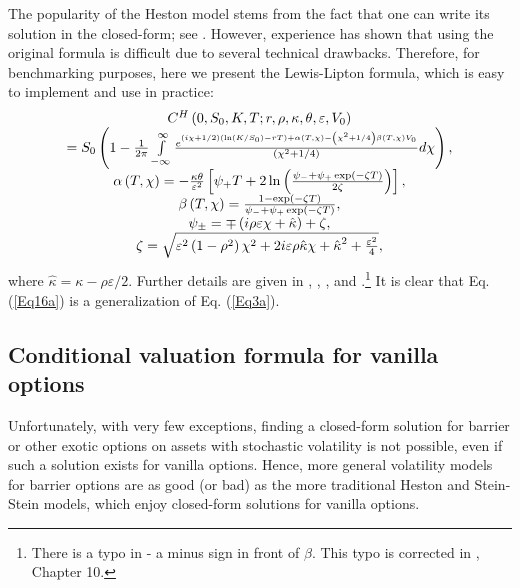 \documentclass{article}
\begin{document}
The popularity of the Heston model stems from the fact that one can write
its solution in the closed-form; see \cite{Heston1993}. However, experience
has shown that using the original formula is difficult due to several
technical drawbacks. Therefore, for benchmarking purposes, here we present
the Lewis-Lipton formula, which is easy to implement and use in practice:%
\begin{equation}
\begin{array}{c}
C^{H}\left( 0,S_{0},K,T;r,\rho ,\kappa ,\theta ,\varepsilon ,V_{0}\right) \\ 
=S_{0}\left( 1-\frac{1}{2\pi }\int\limits_{-\infty }^{\infty }\frac{%
e^{\left( i\chi +1/2\right) \left( \ln \left( K/S_{0}\right) -rT\right)
+\alpha \left( T,\chi \right) -\left( \chi ^{2}+1/4\right) \beta \left(
T,\chi \right) V_{0}}}{\left( \chi ^{2}+1/4\right) }d\chi \right) , \\ 
\alpha \left( T,\chi \right) =-\frac{\kappa \theta }{\varepsilon ^{2}}\left[
\psi _{+}T+2\ln \left( \frac{\psi _{-}+\psi _{+}\exp \left( -\zeta T\right) 
}{2\zeta }\right) \right] , \\ 
\beta \left( T,\chi \right) =\frac{1-\exp \left( -\zeta T\right) }{\psi
_{-}+\psi _{+}\exp \left( -\zeta T\right) }, \\ 
\psi _{\pm }=\mp \left( i\rho \varepsilon \chi +\hat{\kappa}\right) +\zeta ,
\\ 
\zeta =\sqrt{\varepsilon ^{2}\left( 1-\rho ^{2}\right) \chi
^{2}+2i\varepsilon \rho \hat{\kappa}\chi +\hat{\kappa}^{2}+\frac{\varepsilon
^{2}}{4}},%
\end{array}
\label{Eq16a}
\end{equation}%
where $\hat{\kappa}=\kappa -\rho \varepsilon /2$. Further details are given
in \cite{Lewis2000}, \cite{Lipton2001}, \cite{Lipton2002a}, and \cite%
{Schmeltze2010}.\footnote{%
There is a typo in \cite{Lipton2002a} - a minus sign in front of $\beta $.
This typo is corrected in \cite{Lipton2018}, Chapter 10.} It is clear that
Eq. (\ref{Eq16a}) is a generalization of Eq. (\ref{Eq3a}).

\subsection{Conditional valuation formula for vanilla options\label{Sec23}}

Unfortunately, with very few exceptions, finding a closed-form solution for
barrier or other exotic options on assets with stochastic volatility is not
possible, even if such a solution exists for vanilla options. Hence, more
general volatility models for barrier options are as good (or bad) as the
more traditional Heston and Stein-Stein models, which enjoy closed-form
solutions for vanilla options.
\end{document}
